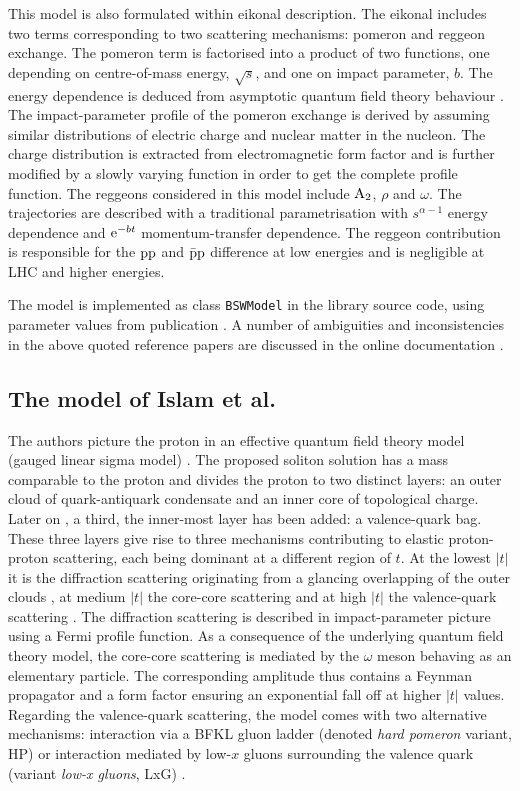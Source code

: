 \documentclass[preprint,12pt]{elsarticle}
\def\class#1{{\tt #1}}
\def\e{{\rm e}}
\begin{document}
This model \cite{bsw79,bsw84,bsw03,bsw11} is also formulated within eikonal description. The eikonal includes two terms corresponding to two scattering mechanisms: pomeron and reggeon exchange. The pomeron term is factorised into a product of two functions, one depending on centre-of-mass energy, $\sqrt s$, and one on impact parameter, $b$. The energy dependence is deduced from asymptotic quantum field theory behaviour \cite{wu70}. The impact-parameter profile of the pomeron exchange is derived by assuming similar distributions of electric charge and nuclear matter in the nucleon. The charge distribution is extracted from electromagnetic form factor and is further modified by a slowly varying function in order to get the complete profile function. The reggeons considered in this model include $\rm A_2$, $\rho$ and $\omega$. The trajectories are described with a traditional parametrisation with $s^{\alpha - 1}$ energy dependence and $\e^{-bt}$ momentum-transfer dependence. The reggeon contribution is responsible for the $\rm pp$ and $\rm \bar pp$ difference at low energies and is negligible at LHC and higher energies.

The model is implemented as class \class{BSWModel} in the library source code, using parameter values from publication \cite{bsw03}. A number of ambiguities and inconsistencies in the above quoted reference papers are discussed in the online documentation \cite[Wiki section, page HMBourrely]{elegent}.

\subsection{The model of Islam et al.}

The authors picture the proton in an effective quantum field theory model (gauged linear sigma model) \cite{islam06}. The proposed soliton solution has a mass comparable to the proton and divides the proton to two distinct layers: an outer cloud of quark-antiquark condensate and an inner core of topological charge. Later on \cite{islam05}, a third, the inner-most layer has been added: a valence-quark bag. These three layers give rise to three mechanisms contributing to elastic proton-proton scattering, each being dominant at a different region of $t$. At the lowest $|t|$ it is the diffraction scattering originating from a glancing overlapping of the outer clouds \cite{islam84,islam87}, at medium $|t|$ the core-core scattering \cite{islam06} and at high $|t|$ the valence-quark scattering \cite{islam05,islam09}. The diffraction scattering is described in impact-parameter picture using a Fermi profile function. As a consequence of the underlying quantum field theory model, the core-core scattering is mediated by the $\omega$ meson behaving as an elementary particle. The corresponding amplitude thus contains a Feynman propagator and a form factor ensuring an exponential fall off at higher $|t|$ values. Regarding the valence-quark scattering, the model comes with two alternative mechanisms: interaction via a BFKL gluon ladder (denoted {\em hard pomeron} variant, HP) \cite{islam05} or interaction mediated by low-$x$ gluons surrounding the valence quark (variant {\em low-x gluons}, LxG) \cite{islam09}.
\end{document}
